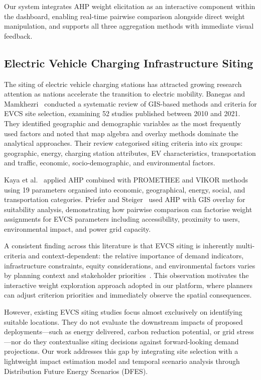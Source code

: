 Our system integrates AHP weight elicitation as an interactive component within the dashboard, enabling real-time pairwise comparison alongside direct weight manipulation, and supports all three aggregation methods with immediate visual feedback.

\subsection{Electric Vehicle Charging Infrastructure Siting}
\label{sec:rw-evcp}

The siting of electric vehicle charging stations has attracted growing research attention as nations accelerate the transition to electric mobility. Banegas and Mamkhezri~\cite{banegas2023systematic} conducted a systematic review of GIS-based methods and criteria for EVCS site selection, examining 52 studies published between 2010 and 2021. They identified geographic and demographic variables as the most frequently used factors and noted that map algebra and overlay methods dominate the analytical approaches. Their review categorised siting criteria into six groups: geographic, energy, charging station attributes, EV characteristics, transportation and traffic, economic, socio-demographic, and environmental factors.

Kaya et al.~\cite{kaya2020evcs} applied AHP combined with PROMETHEE and VIKOR methods using 19 parameters organised into economic, geographical, energy, social, and transportation categories. Priefer and Steiger~\cite{priefer2022evcs} used AHP with GIS overlay for suitability analysis, demonstrating how pairwise comparison can factorise weight assignments for EVCS parameters including accessibility, proximity to users, environmental impact, and power grid capacity.

A consistent finding across this literature is that EVCS siting is inherently multi-criteria and context-dependent: the relative importance of demand indicators, infrastructure constraints, equity considerations, and environmental factors varies by planning context and stakeholder priorities~\cite{banegas2023systematic}. This observation motivates the interactive weight exploration approach adopted in our platform, where planners can adjust criterion priorities and immediately observe the spatial consequences.

However, existing EVCS siting studies focus almost exclusively on identifying suitable locations. They do not evaluate the downstream impacts of proposed deployments---such as energy delivered, carbon reduction potential, or grid stress---nor do they contextualise siting decisions against forward-looking demand projections. Our work addresses this gap by integrating site selection with a lightweight impact estimation model and temporal scenario analysis through Distribution Future Energy Scenarios (DFES).
